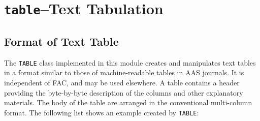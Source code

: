 \documentclass[twoside,letterpaper]{refrep}
\newcommand{\key}[1]{\texttt{#1}}
\newcommand{\mod}[1]{\texttt{#1}}
\begin{document}
\section{\mod{table}--Text Tabulation}
\label{sec:table}
\subsection{Format of Text Table}
\label{subsec:format}
The \key{TABLE} class implemented in this module creates and manipulates
text tables in a format similar to those of machine-readable tables in AAS
journals. It is independent of FAC, and may be used elsewhere. A table
contains a header providing the byte-by-byte description of the columns and
other explanatory materials. The body of the table are arranged in the
conventional multi-column format. The following list shows an example created
by \key{TABLE}:
\end{document}
